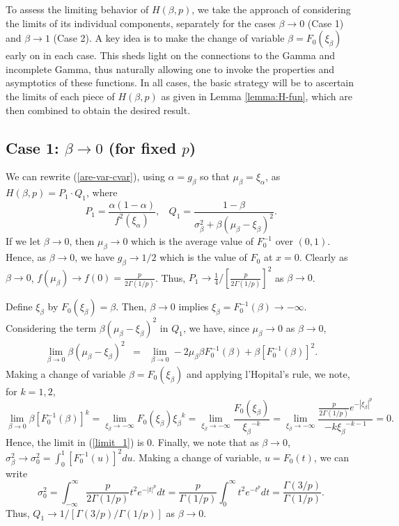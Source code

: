 \documentclass[11pt]{article}
\newcommand{\ds}{\displaystyle}
\newcommand{\bes}{\begin{equation*}}
\newcommand{\ees}{\end{equation*}}
\newcommand{\ba}{\begin{eqnarray}}
\newcommand{\ea}{\end{eqnarray}}
\newcommand{\varalph}{\ensuremath{\xi_{\alpha}}}
\newcommand{\var}{\ensuremath{\xi_{\beta}}}
\newcommand{\B}{\ensuremath{\xi_{\beta}}}
\newcommand{\nc}{\normalcolor}
\begin{document}
To assess the limiting behavior of $H(\beta,p)$, we take the approach
of considering the limits of
its individual components, separately for the cases
$\beta\rightarrow 0$ (Case 1) and $\beta\rightarrow 1$ (Case 2). A key
idea is to make the
change of variable $\beta = F_0(\B)$ early on in each case. This sheds light
on the connections to the Gamma and incomplete Gamma, thus
naturally allowing one to invoke the properties and asymptotics of
these functions.  In all cases, the basic strategy will be to ascertain
the limits of each piece of $H(\beta,p)$ as given in Lemma
\ref{lemma:H-fun}, which are then combined to obtain the desired result.\nc


\subsection*{Case 1: $\beta \rightarrow 0$ (for fixed $p$) }
We can rewrite (\ref{are-var-cvar}), using $\alpha = g_{\beta}$ so that $\mu_{\beta} = \xi_{\alpha}$,
as $H(\beta,p) = P_1 \cdot Q_1$, where
\[
P_1 = \frac{\alpha(1-\alpha)}{f^2(\varalph)}, \ \ \ \ Q_1 = \frac{1-\beta}{\sigma_{\beta}^2 + \beta(\mu_{\beta} - \var)^2}.
\]
If we let $\beta \rightarrow 0$, then $\mu_{\beta} \rightarrow 0$
which is the average value of $F_0^{-1}$ over $(0,1)$.  Hence, as
$\beta \rightarrow 0$, we have $g_{\beta} \rightarrow 1/2$ which is
the value of $F_0$ at $x=0$. Clearly as $\beta \rightarrow 0$,
$f(\mu_{\beta}) \rightarrow f(0) = \frac{p}{2\Gamma(1/p)}$.  
Thus, $P_1 \rightarrow \frac{1}{4}/\left[ \frac{p}{2\Gamma(1/p)} \right]^2$ as $\beta \rightarrow 0$. 
\vspace{0.1in}

\noindent Define $\B$ by $F_0(\B) = \beta$.  Then, $\beta \rightarrow 0$ implies $\B =
F_0^{-1}(\beta) \rightarrow -\infty$. Considering the term $\beta(\mu_{\beta} - \B)^2$ in $Q_1$, we have, since $\mu_{\beta} \rightarrow 0$ as $\beta \rightarrow 0$, 
\ba \label{limit_1}
\lim_{\beta \rightarrow 0} \beta(\mu_{\beta} - \B)^2 &=& \lim_{\beta \rightarrow 0} -2\mu_{\beta} \beta F_0^{-1}(\beta) + \beta[F_0^{-1}(\beta)]^2 .
\ea
Making a change of variable $\beta = F_0(\B)$ and applying l'Hopital's rule, we note, for $k=1,2$, 
\[
\lim_{\beta \rightarrow 0} \beta[F_0^{-1}(\beta)]^k = \lim_{\B \rightarrow -\infty} F_0(\B)\B^k = \lim_{\B \rightarrow -\infty} \frac{F_0(\B)}{\B^{-k}} = \lim_{\B \rightarrow -\infty} \frac{\frac{p}{2\Gamma(1/p)}e^{-|\B|^p}}{-k\B^{-k-1}} = 0.
\]
Hence, the limit in (\ref{limit_1}) is $0$.
Finally, we note that as $\beta \rightarrow 0$, ${\ds \sigma_{\beta}^2 \rightarrow \sigma_0^2 = \int_0^1 [F_0^{-1}(u)]^2 du}$.  Making a change of variable, $u = F_0(t)$, we can write
\bes
\sigma_0^2 = \int_{-\infty}^{\infty} \frac{p}{2\Gamma(1/p)} t^2 e^{-|t|^p} dt = \frac{p}{\Gamma(1/p)} \int_0^{\infty} t^2e^{-t^p} dt =  \frac{\Gamma(3/p)}{\Gamma(1/p)}. 
\ees
Thus, $Q_1 \rightarrow 1/[\Gamma(3/p)/\Gamma(1/p)]$ as $\beta \rightarrow 0$.  
\vspace{0.1in}
\end{document}
